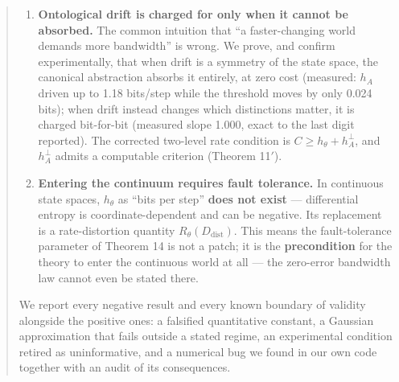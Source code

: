 \documentclass[11pt]{article}
\begin{document}
\begin{abstract}
\begin{enumerate}
  \[C^*(\varepsilon)\;\approx\;h_\theta+\sigma_\theta\,Q^{-1}(\varepsilon),\]
  which introduces a second per-task quantity, the \textbf{operational variance-entropy} \(\sigma_\theta^2\) --- defined not on the raw physical source or channel but on the \textbf{task-induced quotient chain} (the same physical environment run under two different goals has two different values of \(\sigma_\theta\); see the note preceding Part I). \(h_\theta\) fixes the location of the threshold; \(\sigma_\theta\) fixes the width of the transition band. Predicting the threshold from task structure alone --- with no fitted parameters --- gives a mean error of 0.286 bits, a 2.95\(\times\) improvement over the naive prediction.
\item
  \textbf{Ontological drift is charged for only when it cannot be absorbed.} The common intuition that ``a faster-changing world demands more bandwidth'' is wrong. We prove, and confirm experimentally, that when drift is a symmetry of the state space, the canonical abstraction absorbs it entirely, at zero cost (measured: \(h_A\) driven up to 1.18 bits/step while the threshold moves by only 0.024 bits); when drift instead changes which distinctions matter, it is charged bit-for-bit (measured slope 1.000, exact to the last digit reported). The corrected two-level rate condition is \(C\ge h_\theta+h_A^{\perp}\), and \(h_A^\perp\) admits a computable criterion (Theorem 11\('\)).
\item
  \textbf{Entering the continuum requires fault tolerance.} In continuous state spaces, \(h_\theta\) as ``bits per step'' \textbf{does not exist} --- differential entropy is coordinate-dependent and can be negative. Its replacement is a rate-distortion quantity \(R_\theta(D_{\mathrm{dist}})\). This means the fault-tolerance parameter of Theorem 14 is not a patch; it is the \textbf{precondition} for the theory to enter the continuous world at all --- the zero-error bandwidth law cannot even be stated there.
\end{enumerate}

We report every negative result and every known boundary of validity alongside the positive ones: a falsified quantitative constant, a Gaussian approximation that fails outside a stated regime, an experimental condition retired as uninformative, and a numerical bug we found in our own code together with an audit of its consequences.
\end{abstract}

\clearpage
\tableofcontents
\clearpage
\end{document}
